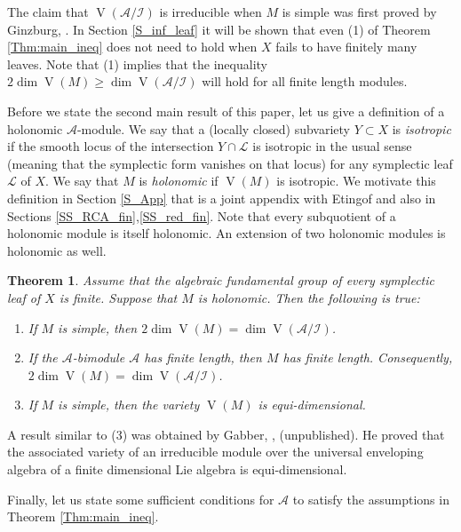 \documentclass[12pt]{amsart}
\newcommand{\A}{\mathcal{A}}
\newcommand{\I}{\mathcal{I}}
\newcommand{\VA}{\operatorname{V}}
\newtheorem{Thm}{Theorem}[section]
\theoremstyle{definition}
\begin{document}
The claim that $\VA(\A/\I)$ is irreducible when $M$ is simple was first proved by Ginzburg, \cite{Ginzburg_Irr}.
In Section \ref{S_inf_leaf}  it will be shown  that even (1)
of Theorem \ref{Thm:main_ineq} does not need to hold when $X$ fails to have finitely many leaves. Note that (1) implies
that the inequality $2\dim \VA(M)\geqslant \dim \VA(\A/\I)$ will hold for all finite length  modules.

Before we state the second main result of this paper, let us give a definition of a holonomic
$\A$-module. We say that a (locally closed) subvariety $Y\subset X$
is {\it isotropic} if the smooth locus of the intersection $Y\cap \mathcal{L}$ is isotropic in the usual sense
(meaning that the symplectic form vanishes on that  locus)
for any symplectic leaf $\mathcal{L}$ of $X$.  We say that $M$ is {\it holonomic} if $\VA(M)$ is isotropic.
We motivate this definition in Section \ref{S_App} that is a joint appendix with Etingof
and also in Sections \ref{SS_RCA_fin},\ref{SS_red_fin}. Note
that every subquotient of a holonomic module is itself holonomic. An extension of two holonomic modules
is holonomic as well.

\begin{Thm}\label{Thm:main_eq}
Assume that the algebraic fundamental group of every symplectic leaf of $X$ is finite.
Suppose that $M$ is holonomic. Then the following is true:
\begin{enumerate}
\item If  $M$ is simple, then $2\dim \VA(M)=\dim \VA(\A/\I)$.
\item If the $\A$-bimodule $\A$ has finite length, then $M$ has finite length.
Consequently, $2\dim \VA(M)=\dim \VA(\A/\I)$.
\item If $M$ is simple, then the variety $\VA(M)$ is equi-dimensional.
\end{enumerate}
\end{Thm}

A result similar to (3) was obtained by Gabber, \cite{Gabber_equi}, (unpublished).
He proved that the associated variety of an irreducible module over the universal
enveloping algebra of a finite dimensional Lie algebra is equi-dimensional.


Finally, let us state some sufficient conditions for $\A$ to satisfy the assumptions in Theorem \ref{Thm:main_ineq}.
\end{document}
